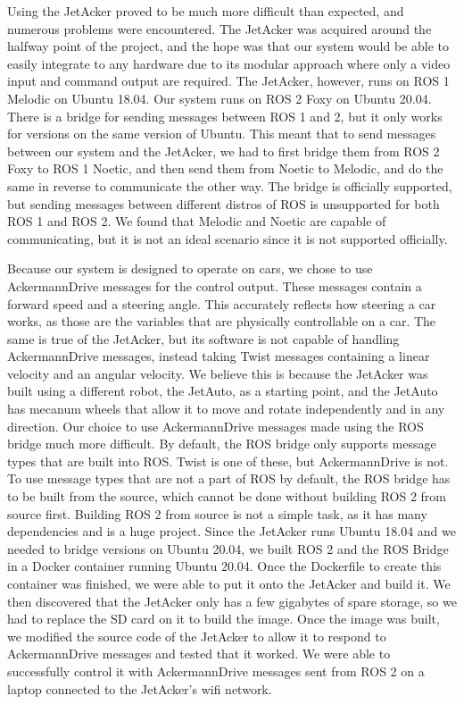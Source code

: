 \documentclass[titlepage, draft]{article}
\begin{document}
{Using the JetAcker proved to be much more difficult than expected, and numerous problems were encountered. The JetAcker was acquired around the halfway point of the project, and the hope was that our system would be able to easily integrate to any hardware due to its modular approach where only a video input and command output are required. The JetAcker, however, runs on ROS 1 Melodic on Ubuntu 18.04. Our system runs on ROS 2 Foxy on Ubuntu 20.04. There is a bridge for sending messages between ROS 1 and 2, but it only works for versions on the same version of Ubuntu. This meant that to send messages between our system and the JetAcker, we had to first bridge them from ROS 2 Foxy to ROS 1 Noetic, and then send them from Noetic to Melodic, and do the same in reverse to communicate the other way. The bridge is officially supported, but sending messages between different distros of ROS is unsupported for both ROS 1 and ROS 2. We found that Melodic and Noetic are capable of communicating, but it is not an ideal scenario since it is not supported officially.

Because our system is designed to operate on cars, we chose to use AckermannDrive messages for the control output. These messages contain a forward speed and a steering angle. This accurately reflects how steering a car works, as those are the variables that are physically controllable on a car. The same is true of the JetAcker, but its software is not capable of handling AckermannDrive messages, instead taking Twist messages containing a linear velocity and an angular velocity. We believe this is because the JetAcker was built using a different robot, the JetAuto, as a starting point, and the JetAuto has mecanum wheels that allow it to move and rotate independently and in any direction. Our choice to use AckermannDrive messages made using the ROS bridge much more difficult. By default, the ROS bridge only supports message types that are built into ROS. Twist is one of these, but AckermannDrive is not. To use message types that are not a part of ROS by default, the ROS bridge has to be built from the source, which cannot be done without building ROS 2 from source first. Building ROS 2 from source is not a simple task, as it has many dependencies and is a huge project. Since the JetAcker runs Ubuntu 18.04 and we needed to bridge versions on Ubuntu 20.04, we built ROS 2 and the ROS Bridge in a Docker container running Ubuntu 20.04. Once the Dockerfile to create this container was finished, we were able to put it onto the JetAcker and build it. We then discovered that the JetAcker only has a few gigabytes of spare storage, so we had to replace the SD card on it to build the image. Once the image was built, we modified the source code of the JetAcker to allow it to respond to AckermannDrive messages and tested that it worked. We were able to successfully control it with AckermannDrive messages sent from ROS 2 on a laptop connected to the JetAcker's wifi network.

}
\end{document}
